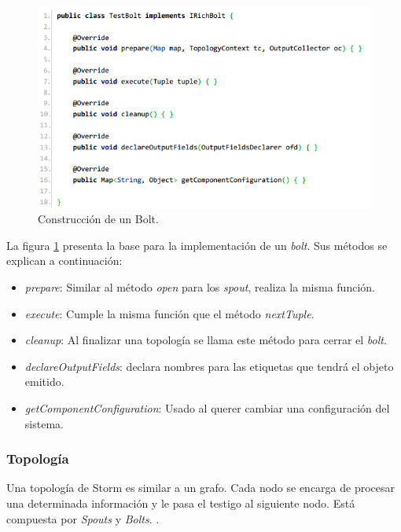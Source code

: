 	\begin{figure}[H]
		\centering
		\captionsetup{justification=centering}
		\includegraphics[scale=0.8]{images/BoltBase.png}
		\caption[Construcción de un Bolt.]{Construcción de un Bolt.}
		\label{fig:boltbase}
	\end{figure}

	La figura \ref{fig:boltbase} presenta la base para la implementación de un \textit{bolt}. Sus métodos se explican a continuación:

	\begin{itemize}
	\item \textit{prepare}: Similar al método \textit{open} para los \textit{spout}, realiza la misma función.
	\item \textit{execute}: Cumple la misma función que el método \textit{nextTuple}.
	\item \textit{cleanup}: Al finalizar una topología se llama este método para cerrar el \textit{bolt}.
	\item \textit{declareOutputFields}: declara nombres para las etiquetas que tendrá el objeto emitido.
	\item \textit{getComponentConfiguration}: Usado al querer cambiar una configuración del sistema.
	\end{itemize}

	\subsubsection{Topología}
	\label{subsubsec:topologia}

	Una topología de Storm es similar a un grafo. Cada nodo se encarga de procesar una determinada información y le pasa el testigo al siguiente nodo. Está compuesta por \textit{Spouts} y \textit{Bolts}. \cite{Storm}.

